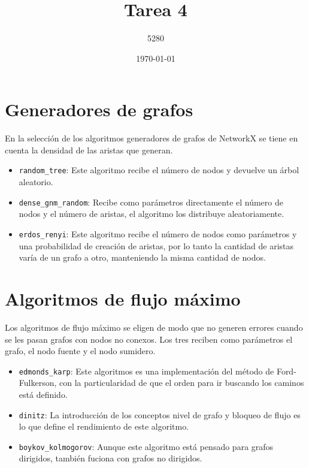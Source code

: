 \documentclass{article}
\title{
Tarea 4
}
\author{5280}
\date{\today}
\begin{document}
\maketitle

\section*{Generadores de grafos} 

En la selección de los algoritmos generadores de grafos de NetworkX \citep{networkx} se tiene en cuenta la densidad de las aristas que generan.

\begin{itemize}
\item \texttt{random\_tree}: Este algoritmo recibe el número de nodos y devuelve un árbol aleatorio. 

\item \texttt{dense\_gnm\_random}: Recibe como parámetros directamente el número de nodos y el número de aristas, el algoritmo los distribuye aleatoriamente.

\item \texttt{erdos\_renyi}: Este algoritmo recibe el número de nodos como parámetros y una probabilidad de creación de aristas, por lo tanto la cantidad de aristas varía de un grafo a otro, manteniendo la misma cantidad de nodos. 
\end{itemize}

\section*{Algoritmos de flujo máximo}

Los algoritmos de flujo máximo se eligen de modo que no generen errores cuando se les pasan grafos con nodos no conexos. Los tres reciben como parámetros el grafo, el nodo fuente y el nodo sumidero.

\begin{itemize}
\item \texttt{edmonds\_karp}: Este algoritmos es una implementación del método de Ford-Fulkerson, con la particularidad de que el orden para ir buscando los caminos está definido.

\item \texttt{dinitz}: La introducción de los conceptos nivel de grafo y bloqueo de flujo es lo que define el rendimiento de este algoritmo.

\item \texttt{boykov\_kolmogorov}: Aunque este algoritmo está pensado para grafos dirigidos, también fuciona con grafos no dirigidos.

\end{itemize} 
\end{document}
